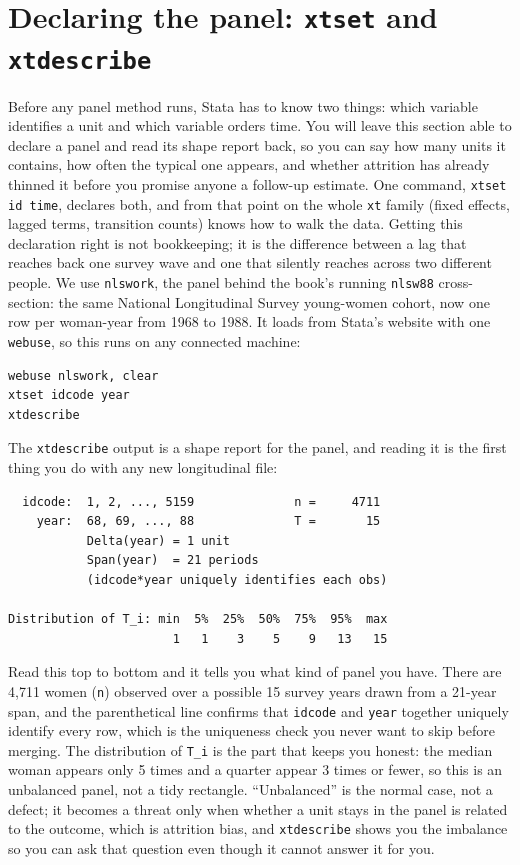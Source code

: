 \documentclass[
    a4paper,
    fontsize=10pt,
    twoside=true,
    numbers=noenddot,
]{kaobook}
\begin{document}
\section{Declaring the panel: \texttt{xtset} and \texttt{xtdescribe}}\label{sec:xtset}
Before any panel method runs, Stata has to know two things: which variable identifies a unit and which variable orders time. You will leave this section able to declare a panel and read its shape report back, so you can say how many units it contains, how often the typical one appears, and whether attrition has already thinned it before you promise anyone a follow-up estimate. One command, \texttt{xtset id time}, declares both, and from that point on the whole \texttt{xt} family (fixed effects, lagged terms, transition counts) knows how to walk the data. Getting this declaration right is not bookkeeping; it is the difference between a lag that reaches back one survey wave and one that silently reaches across two different people. We use \texttt{nlswork}, the panel behind the book's running \texttt{nlsw88} cross-section: the same National Longitudinal Survey young-women cohort, now one row per woman-year from 1968 to 1988. It loads from Stata's website with one \texttt{webuse}, so this runs on any connected machine:
\par
{\footnotesize
\begin{verbatim}
webuse nlswork, clear
xtset idcode year
xtdescribe
\end{verbatim}
}
The \texttt{xtdescribe} output is a shape report for the panel, and reading it is the first thing you do with any new longitudinal file:
\par
{\footnotesize
\begin{verbatim}
  idcode:  1, 2, ..., 5159              n =     4711
    year:  68, 69, ..., 88              T =       15
           Delta(year) = 1 unit
           Span(year)  = 21 periods
           (idcode*year uniquely identifies each obs)

Distribution of T_i: min  5%  25%  50%  75%  95%  max
                       1   1    3    5    9   13   15
\end{verbatim}
}
Read this top to bottom and it tells you what kind of panel you have. There are 4{,}711 women (\texttt{n}) observed over a possible 15 survey years drawn from a 21-year span, and the parenthetical line confirms that \texttt{idcode} and \texttt{year} together uniquely identify every row, which is the uniqueness check you never want to skip before merging. The distribution of \texttt{T\_i} is the part that keeps you honest: the median woman appears only 5 times and a quarter appear 3 times or fewer, so this is an unbalanced panel, not a tidy rectangle. \enquote{Unbalanced} is the normal case, not a defect; it becomes a threat only when whether a unit stays in the panel is related to the outcome, which is attrition bias, and \texttt{xtdescribe} shows you the imbalance so you can ask that question even though it cannot answer it for you.
\end{document}
